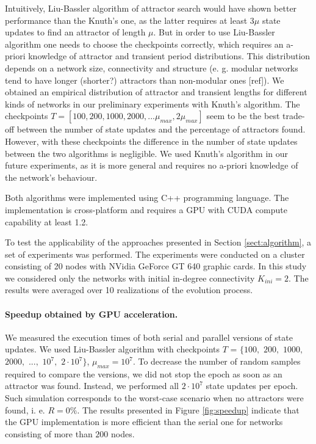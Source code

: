 \documentclass[procedia]{easychair}
\begin{document}
	Intuitively, Liu-Bassler algorithm of attractor search would have shown better performance than the Knuth's one, as the latter requires at least $3 \mu$ state updates to find an attractor of length $\mu$. But in order to use Liu-Bassler algorithm one needs to choose the checkpoints correctly, which requires an a-priori knowledge of attractor and transient period distributions. This distribution depends on a network size, connectivity and structure (e. g. modular networks tend to have longer (shorter?) attractors than non-modular ones [ref]). We obtained an empirical distribution of attractor and transient lengths for different kinds of networks in our preliminary experiments with Knuth's algorithm. The checkpoints $T=[100, 200, 1000, 2000, ... \mu_{max}, 2 \mu_{max}]$ seem to be the best trade-off between the number of state updates and the percentage of attractors found. However, with these checkpoints the difference in the number of state updates between the two algorithms is negligible. We used Knuth's algorithm in our future experiments, as it is more general and requires no a-priori knowledge of the network's behaviour.
	
	Both algorithms were implemented using C++ programming language. The implementation is cross-platform and requires a GPU with CUDA compute capability at least 1.2. 
	
	To test the applicability of the approaches presented in Section \ref{sect:algorithm}, a set of experiments was performed. The experiments were conducted on a cluster consisting of 20 nodes with NVidia GeForce GT 640 graphic cards. In this study we considered only the networks with initial in-degree connectivity $K_{ini}=2$. The results were averaged over 10 realizations of the evolution process.
	
	\paragraph{Speedup obtained by GPU acceleration.} We measured the execution times of both serial and parallel versions of state updates. We used Liu-Bassler algorithm with checkpoints $T$ = $\{100,$ $200,$ $1000,$ $2000,$ $...,$ $10^7,$ $2 \cdot 10^7\}$, $\mu_{max} = 10^7$. To decrease the number of random samples required to compare the versions, we did not stop the epoch as soon as an attractor was found. Instead, we performed all $2 \cdot 10^7$ state updates per epoch. Such simulation corresponds to the worst-case scenario when no attractors were found, i. e. $R = 0\%$. The results presented in Figure \ref{fig:speedup} indicate that the GPU implementation is more efficient than the serial one for networks consisting of more than $200$ nodes.
	
\end{document}
